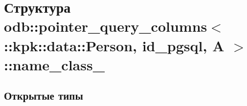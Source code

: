 \hypertarget{structodb_1_1pointer__query__columns_3_01_1_1kpk_1_1data_1_1_person_00_01id__pgsql_00_01_a_01_4_1_1name__class__}{}\section{Структура odb\+:\+:pointer\+\_\+query\+\_\+columns$<$ \+:\+:kpk\+:\+:data\+:\+:Person, id\+\_\+pgsql, A $>$\+:\+:name\+\_\+class\+\_\+}
\label{structodb_1_1pointer__query__columns_3_01_1_1kpk_1_1data_1_1_person_00_01id__pgsql_00_01_a_01_4_1_1name__class__}
\subsection*{Открытые типы}
